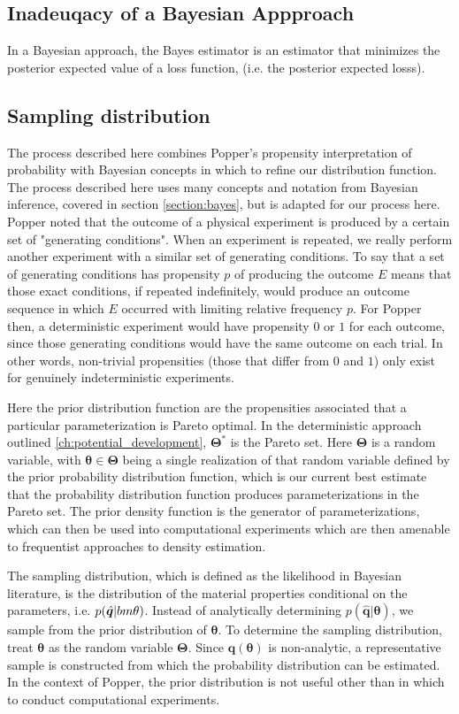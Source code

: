 \subsection{Inadeuqacy of a Bayesian Appproach}
In a Bayesian approach, the Bayes estimator is an estimator that minimizes the posterior expected value of a loss function, (i.e. the posterior expected losss).

\subsection{Sampling distribution}
The process described here combines Popper's propensity interpretation of probability with Bayesian concepts in which to refine our distribution function.  The process described here uses many concepts and notation from Bayesian inference, covered in section \ref{section:bayes}, but is adapted for our process here.  Popper noted that the outcome of a physical experiment is produced by a certain set of "generating conditions". When an experiment is repeated, we really perform another experiment with a similar set of generating conditions. To say that a set of generating conditions has propensity $p$ of producing the outcome $E$ means that those exact conditions, if repeated indefinitely, would produce an outcome sequence in which $E$ occurred with limiting relative frequency $p$. For Popper then, a deterministic experiment would have propensity $0$ or $1$ for each outcome, since those generating conditions would have the same outcome on each trial. In other words, non-trivial propensities (those that differ from $0$ and $1$) only exist for genuinely indeterministic experiments.

Here the prior distribution function are the propensities associated that a particular parameterization is Pareto optimal.  In the deterministic approach outlined \ref{ch:potential_development}, $\bm{\Theta}^*$ is the Pareto set.  Here $\bm{\Theta}$ is a random variable, with $\bm{\theta} \in \bm{\Theta}$ being a single realization of that random variable defined by the prior probability distribution function, which is our current best estimate that the probability distribution function produces parameterizations in the Pareto set.  The prior density function is the generator of parameterizations, which can then be used into computational experiments which are then amenable to frequentist approaches to density estimation.

The sampling distribution, which is defined as the likelihood in Bayesian literature, is the distribution of the material properties conditional on the parameters, i.e. $p(\hat{\bm{q}}|\\bm{\theta})$.  Instead of analytically determining $p(\bm{\hat{q}}|\bm{\theta})$, we sample from the prior distribution of $\bm{\theta}$.  To determine the sampling distribution, treat $\bm{\theta}$ as the random variable $\bm{\Theta}$.   Since $\bm{q}(\bm{\theta})$ is non-analytic, a representative sample is constructed from which the probability distribution can be estimated.  In the context of Popper, the prior distribution is not useful other than in which to conduct computational experiments. 

